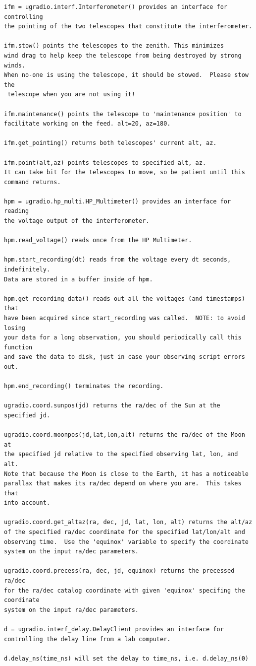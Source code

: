\documentclass[11pt,preprint]{aastex}
\begin{document}
\begin{verbatim}
ifm = ugradio.interf.Interferometer() provides an interface for controlling 
the pointing of the two telescopes that constitute the interferometer.

ifm.stow() points the telescopes to the zenith. This minimizes 
wind drag to help keep the telescope from being destroyed by strong winds. 
When no-one is using the telescope, it should be stowed.  Please stow the
 telescope when you are not using it!

ifm.maintenance() points the telescope to 'maintenance position' to 
facilitate working on the feed. alt=20, az=180.

ifm.get_pointing() returns both telescopes' current alt, az.

ifm.point(alt,az) points telescopes to specified alt, az.
It can take bit for the telescopes to move, so be patient until this
command returns.

hpm = ugradio.hp_multi.HP_Multimeter() provides an interface for reading
the voltage output of the interferometer.

hpm.read_voltage() reads once from the HP Multimeter.

hpm.start_recording(dt) reads from the voltage every dt seconds, indefinitely.
Data are stored in a buffer inside of hpm.

hpm.get_recording_data() reads out all the voltages (and timestamps) that
have been acquired since start_recording was called.  NOTE: to avoid losing
your data for a long observation, you should periodically call this function
and save the data to disk, just in case your observing script errors out.

hpm.end_recording() terminates the recording.  

ugradio.coord.sunpos(jd) returns the ra/dec of the Sun at the specified jd.

ugradio.coord.moonpos(jd,lat,lon,alt) returns the ra/dec of the Moon at
the specified jd relative to the specified observing lat, lon, and alt.
Note that because the Moon is close to the Earth, it has a noticeable
parallax that makes its ra/dec depend on where you are.  This takes that
into account.

ugradio.coord.get_altaz(ra, dec, jd, lat, lon, alt) returns the alt/az
of the specified ra/dec coordinate for the specified lat/lon/alt and
observing time.  Use the 'equinox' variable to specify the coordinate
system on the input ra/dec parameters.

ugradio.coord.precess(ra, dec, jd, equinox) returns the precessed ra/dec
for the ra/dec catalog coordinate with given 'equinox' specifing the coordinate
system on the input ra/dec parameters.

d = ugradio.interf_delay.DelayClient provides an interface for controlling the delay line from a lab computer.

d.delay_ns(time_ns) will set the delay to time_ns, i.e. d.delay_ns(0)

\end{verbatim}
\end{document}
